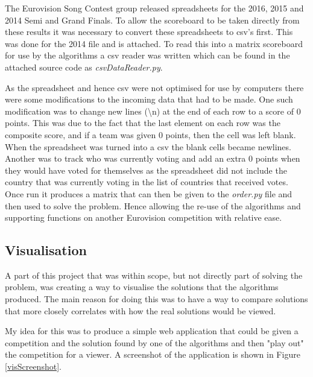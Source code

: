 \documentclass[12pt]{report}
\begin{document}
The Eurovision Song Contest group released spreadsheets for the 2016, 2015 and 2014 Semi and Grand Finals. To allow the scoreboard to be taken directly from these results it was necessary to convert these spreadsheets to csv's first. This was done for the 2014 file and is attached. To read this into a matrix scoreboard for use by the algorithms a csv reader was written which can be found in the attached source code as \textit{csvDataReader.py}.

As the spreadsheet and hence csv were not optimised for use by computers there were some modifications to the incoming data that had to be made. One such modification was to change new lines (\textbackslash n) at the end of each row to a score of 0 points. This was due to the fact that the last element on each row was the composite score, and if a team was given 0 points, then the cell was left blank. When the spreadsheet was turned into a csv the blank cells became newlines. Another was to track who was currently voting and add an extra 0 points when they would have voted for themselves as the spreadsheet did not include the country that was currently voting in the list of countries that received votes. Once run it produces a matrix that can then be given to the \textit{order.py} file and then used to solve the problem. Hence allowing the re-use of the algorithms and supporting functions on another Eurovision competition with relative ease.

\subsection{Visualisation}\label{Imp-Vis}
A part of this project that was within scope, but not directly part of solving the problem, was creating a way to visualise the solutions that the algorithms produced. The main reason for doing this was to have a way to compare solutions that more closely correlates with how the real solutions would be viewed.

My idea for this was to produce a simple web application that could be given a competition and the solution found by one of the algorithms and then "play out" the competition for a viewer. A screenshot of the application is shown in Figure \ref{visScreenshot}.
\end{document}
